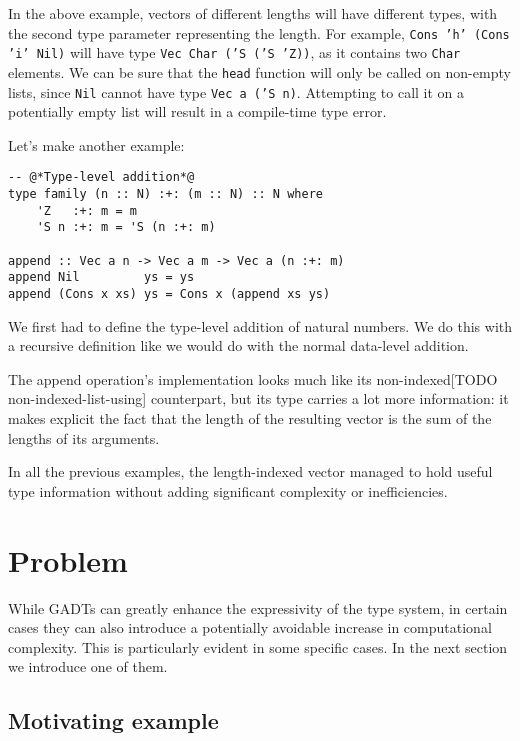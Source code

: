 In the above example, vectors of different lengths will have different types, with the second type parameter representing the length.
For example, \texttt{Cons 'h' (Cons 'i' Nil)} will have type \texttt{Vec Char ('S ('S 'Z))}, as it contains two \texttt{Char} elements.
We can be sure that the \texttt{head} function will only be called on non-empty lists, since \texttt{Nil} cannot have type \texttt{Vec a ('S n)}.
Attempting to call it on a potentially empty list will result in a compile-time type error.

Let's make another example:

\begin{lstlisting}[caption=Appending a \texttt{Vec} to another]
-- @*Type-level addition*@
type family (n :: N) :+: (m :: N) :: N where
    'Z   :+: m = m
    'S n :+: m = 'S (n :+: m)

append :: Vec a n -> Vec a m -> Vec a (n :+: m)
append Nil         ys = ys
append (Cons x xs) ys = Cons x (append xs ys)
\end{lstlisting}

We first had to define the type-level addition of natural numbers. We do this with a recursive definition like we would do with the normal data-level addition.

The append operation's implementation looks much like its non-indexed[TODO non-indexed-list-using] counterpart, but its type carries a lot more information: it makes explicit the fact that the length of the resulting vector is the sum of the lengths of its arguments.

In all the previous examples, the length-indexed vector managed to hold useful type information without adding significant complexity or inefficiencies.

\section{Problem}
\label{sec:problem}

While GADTs can greatly enhance the expressivity of the type system, in certain cases they can also introduce a potentially avoidable increase in computational complexity.
This is particularly evident in some specific cases.
In the next section we introduce one of them.

\subsection{Motivating example}
\label{subsec:motivating-example}

